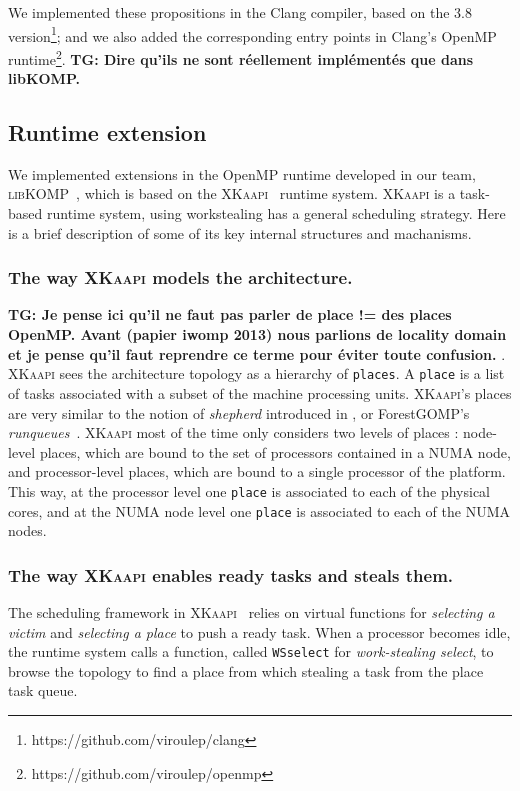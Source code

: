 \documentclass{Styles/llncs}
\newcommand{\kaapi}{\textsc{\mbox{XKaapi}}\xspace}
\newcommand{\libXKOMP}{\textsc{libKOMP}\xspace}
\newcommand{\TG}[1]{{\color{red}\bfseries TG: #1}}
\begin{document}
We implemented these propositions in the Clang compiler, based on the 3.8 version\footnote{https://github.com/viroulep/clang}; and we also added the corresponding entry points in Clang's OpenMP runtime\footnote{https://github.com/viroulep/openmp}.
\TG{Dire qu'ils ne sont réellement implémentés que dans libKOMP.}


\subsection{Runtime extension}

We implemented extensions in the OpenMP runtime developed in our team, \libXKOMP~\cite{Durand2013,libkomp},
which is based on the \kaapi~\cite{Bleuse2014,parco2015} runtime system.
\kaapi is a task-based runtime system, using workstealing has a general scheduling strategy.
Here is a brief description of some of its key internal structures and machanisms.

\subsubsection{The way \kaapi models the architecture.}
\TG{Je pense ici qu'il ne faut pas parler de place != des places OpenMP. Avant (papier iwomp 2013) nous parlions de locality domain et je pense qu'il faut reprendre ce terme pour éviter toute confusion. }.
\kaapi sees the architecture topology as a hierarchy of \verb/places/.
A \verb/place/ is a list of tasks associated with a subset of the machine processing units.
\kaapi's places are very similar to the notion of \emph{shepherd} introduced in \cite{DBLP:journals/ijhpca/OlivierPWSP12}, or ForestGOMP's \emph{runqueues}~\cite{BroFurGogWacNam10IJPP}.
\kaapi most of the time only considers two levels of places : node-level places,
which are bound to the set of processors contained in a NUMA node, and processor-level places, which are bound to a single processor of the platform.
This way, at the processor level one \verb/place/ is associated to each of the physical cores, and
at the NUMA node level one \verb/place/ is associated to each of the NUMA nodes.


\subsubsection{The way \kaapi enables ready tasks and steals them.}

The scheduling framework in \kaapi~\cite{Bleuse2014,parco2015} relies on virtual functions
for \textit{selecting a victim} and \textit{selecting a place} to push a ready task.
When a processor becomes idle, the runtime system calls a function, called  \verb/WSselect/ for \emph{work-stealing select}, to browse the topology to find a place from which stealing a task from the place task queue.
\end{document}
